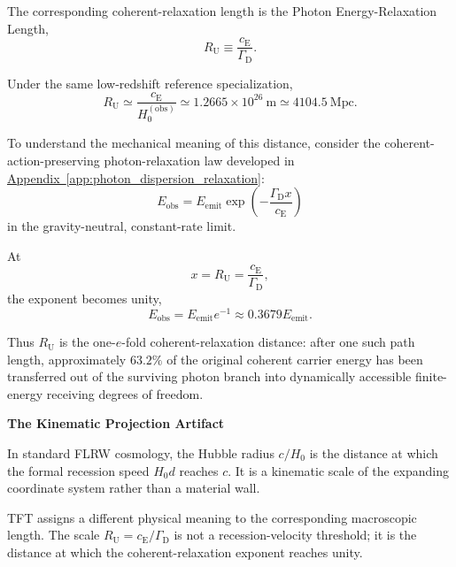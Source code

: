 The corresponding coherent-relaxation length is the Photon Energy-Relaxation Length,
\begin{equation}
    R_{\mathrm U}
    \equiv
    \frac{c_{\mathrm E}}{\Gamma_{\mathrm D}}.
\end{equation}

Under the same low-redshift reference specialization,
\begin{equation}
    R_{\mathrm U}
    \simeq
    \frac{c_{\mathrm E}}{H_0^{(\mathrm{obs})}}
    \simeq
    1.2665\times10^{26}\ \mathrm{m}
    \simeq
    4104.5\ \mathrm{Mpc}.
\end{equation}

To understand the mechanical meaning of this distance, consider the coherent-action-preserving photon-relaxation law developed in
\hyperref[app:photon_dispersion_relaxation]{Appendix~\ref*{app:photon_dispersion_relaxation}}:
\begin{equation}
    E_{\mathrm{obs}}
    =
    E_{\mathrm{emit}}
    \exp\left(
        -\frac{\Gamma_{\mathrm D}x}{c_{\mathrm E}}
    \right)
\end{equation}
in the gravity-neutral, constant-rate limit.

At
\begin{equation}
    x
    =
    R_{\mathrm U}
    =
    \frac{c_{\mathrm E}}{\Gamma_{\mathrm D}},
\end{equation}
the exponent becomes unity,
\begin{equation}
    E_{\mathrm{obs}}
    =
    E_{\mathrm{emit}}e^{-1}
    \approx
    0.3679E_{\mathrm{emit}}.
\end{equation}

Thus $R_{\mathrm U}$ is the one-$e$-fold coherent-relaxation distance: after one such path length, approximately $63.2\%$ of the original coherent carrier energy has been transferred out of the surviving photon branch into dynamically accessible finite-energy receiving degrees of freedom.

\vspace{0.5em}

\label{sec:kinematic_projection_artifact}

\noindent\textbf{The Kinematic Projection Artifact}

In standard FLRW cosmology, the Hubble radius $c/H_0$ is the distance at which the formal recession speed $H_0d$ reaches $c$. It is a kinematic scale of the expanding coordinate system rather than a material wall.

TFT assigns a different physical meaning to the corresponding macroscopic length. The scale $R_{\mathrm U}=c_{\mathrm E}/\Gamma_{\mathrm D}$ is not a recession-velocity threshold; it is the distance at which the coherent-relaxation exponent reaches unity.

